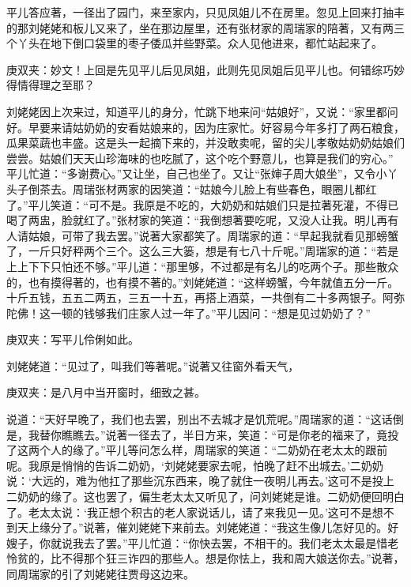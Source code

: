 \begin{parag}
    平儿答应著，一径出了园门，来至家内，只见凤姐儿不在房里。忽见上回来打抽丰的那刘姥姥和板儿又来了，坐在那边屋里，还有张材家的周瑞家的陪著，又有两三个丫头在地下倒口袋里的枣子倭瓜并些野菜。众人见他进来，都忙站起来了。\begin{note}庚双夹：妙文！上回是先见平儿后见凤姐，此则先见凤姐后见平儿也。何错综巧妙得情得理之至耶？\end{note}刘姥姥因上次来过，知道平儿的身分，忙跳下地来问“姑娘好”，又说：“家里都问好。早要来请姑奶奶的安看姑娘来的，因为庄家忙。好容易今年多打了两石粮食，瓜果菜蔬也丰盛。这是头一起摘下来的，并没敢卖呢，留的尖儿孝敬姑奶奶姑娘们尝尝。姑娘们天天山珍海味的也吃腻了，这个吃个野意儿，也算是我们的穷心。” 平儿忙道：“多谢费心。”又让坐，自己也坐了。又让“张婶子周大娘坐”，又令小丫头子倒茶去。周瑞张材两家的因笑道：“姑娘今儿脸上有些春色，眼圈儿都红了。”平儿笑道：“可不是。我原是不吃的，大奶奶和姑娘们只是拉著死灌，不得已喝了两盅，脸就红了。”张材家的笑道：“我倒想著要吃呢，又没人让我。明儿再有人请姑娘，可带了我去罢。”说著大家都笑了。周瑞家的道：“早起我就看见那螃蟹了，一斤只好秤两个三个。这么三大篓，想是有七八十斤呢。”周瑞家的道：“若是上上下下只怕还不够。”平儿道：“那里够，不过都是有名儿的吃两个子。那些散众的，也有摸得著的，也有摸不著的。”刘姥姥道：“这样螃蟹，今年就值五分一斤。十斤五钱，五五二两五，三五一十五，再搭上酒菜，一共倒有二十多两银子。阿弥陀佛！这一顿的钱够我们庄家人过一年了。”平儿因问：“想是见过奶奶了？”\begin{note}庚双夹：写平儿伶俐如此。\end{note}刘姥姥道：“见过了，叫我们等著呢。”说著又往窗外看天气，\begin{note}庚双夹：是八月中当开窗时，细致之甚。\end{note}说道：“天好早晚了，我们也去罢，别出不去城才是饥荒呢。”周瑞家的道：“这话倒是，我替你瞧瞧去。”说著一径去了，半日方来，笑道：“可是你老的福来了，竟投了这两个人的缘了。”平儿等问怎么样，周瑞家的笑道：“二奶奶在老太太的跟前呢。我原是悄悄的告诉二奶奶，‘刘姥姥要家去呢，怕晚了赶不出城去。’二奶奶说：‘大远的，难为他扛了那些沉东西来，晚了就住一夜明儿再去。’这可不是投上二奶奶的缘了。这也罢了，偏生老太太又听见了，问刘姥姥是谁。二奶奶便回明白了。老太太说：‘我正想个积古的老人家说话儿，请了来我见一见。’这可不是想不到天上缘分了。”说著，催刘姥姥下来前去。刘姥姥道：“我这生像儿怎好见的。好嫂子，你就说我去了罢。”平儿忙道：“你快去罢，不相干的。我们老太太最是惜老怜贫的，比不得那个狂三诈四的那些人。想是你怯上，我和周大娘送你去。”说著，同周瑞家的引了刘姥姥往贾母这边来。
\end{parag}


